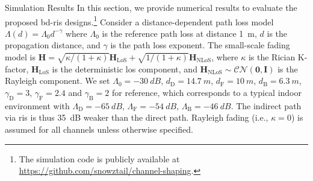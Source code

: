 \documentclass[journal]{IEEEtran}
\begin{document}
\begin{section}{Simulation Results}\label{sc:simulation}
	In this section, we provide numerical results to evaluate the proposed \gls{bd}-\gls{ris} designs.\footnote{The simulation code is publicly available at \url{https://github.com/snowztail/channel-shaping}.}
	Consider a distance-dependent path loss model $\Lambda(d) = \Lambda_0 d^{-\gamma}$ where $\Lambda_0$ is the reference path loss at distance \qty{1}{m}, $d$ is the propagation distance, and $\gamma$ is the path loss exponent.
	The small-scale fading model is $\mathbf{H} = \sqrt{\kappa/(1+\kappa)} \mathbf{H}_\text{LoS} + \sqrt{1/(1+\kappa)} \mathbf{H}_\text{NLoS}$, where $\kappa$ is the Rician K-factor, $\mathbf{H}_\text{LoS}$ is the deterministic \gls{los} component, and $\mathbf{H}_\text{NLoS} \sim \mathcal{CN}(\mathbf{0}, \mathbf{I})$ is the Rayleigh component.
	We set $\Lambda_0=\qty{-30}{dB}$, $d_\mathrm{D}=\qty{14.7}{m}$, $d_\mathrm{F}=\qty{10}{m}$, $d_\mathrm{B}=\qty{6.3}{m}$, $\gamma_\mathrm{D}=3$, $\gamma_\mathrm{F}=2.4$ and $\gamma_\mathrm{B}=2$ for reference, which corresponds to a typical indoor environment with $\Lambda_\mathrm{D}=\qty{-65}{dB}$, $\Lambda_\mathrm{F}=\qty{-54}{dB}$, $\Lambda_\mathrm{B}=\qty{-46}{dB}$.
	The indirect path via \gls{ris} is thus \qty{35}{\dB} weaker than the direct path.
	Rayleigh fading (i.e., $\kappa = 0$) is assumed for all channels unless otherwise specified.


\end{section}
\end{document}
